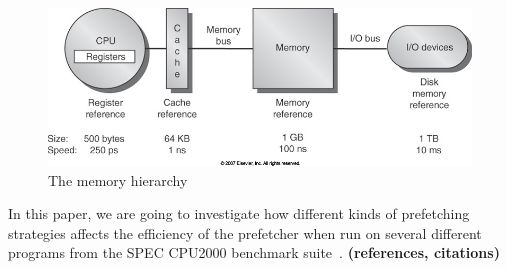 \begin{figure}[H]
	\centering
	\includegraphics[scale=0.3]{./img/mem_hier}
	\caption{The memory hierarchy}
	\label{img:mem_hier}
\end{figure}

In this paper, we are going to investigate how different kinds of
prefetching strategies affects the efficiency of the prefetcher when
run on several different programs from the SPEC CPU2000 benchmark
suite~\cite{SPECFAQ}.  {\bf (references, citations)}

